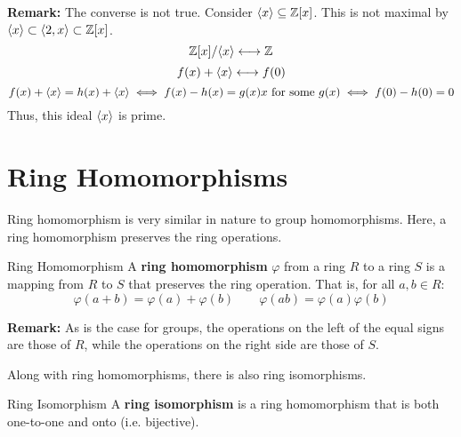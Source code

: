 \documentclass[letterpaper]{article}
\begin{document}
\textbf{Remark:} The converse is not true. Consider $\langle x \rangle \subseteq \mathbb{Z}[x]$. This is not maximal by $\langle x \rangle \subset \langle 2, x \rangle \subset \mathbb{Z}[x]$. 
\[\mathbb{Z}[x] / \langle x \rangle \longleftrightarrow \mathbb{Z}\]
\[f(x) + \langle x \rangle \longleftrightarrow f(0)\]
\[f(x) + \langle x \rangle = h(x) + \langle x \rangle \iff f(x) - h(x) = g(x)x \text{ for some } g(x) \iff f(0) - h(0) = 0\]
Thus, this ideal $\langle x \rangle$ is prime.

















\newpage
\section{Ring Homomorphisms}
Ring homomorphism is very similar in nature to group homomorphisms. Here, a ring homomorphism preserves the ring operations.

\begin{definition}{Ring Homomorphism}{}
    A \textbf{ring homomorphism} $\varphi$ from a ring $R$ to a ring $S$ is a mapping from $R$ to $S$ that preserves the ring operation. That is, for all $a, b \in R$:
    \[\varphi(a + b) = \varphi(a) + \varphi(b) \qquad \varphi(ab) = \varphi(a)\varphi(b)\]
\end{definition}
\textbf{Remark:} As is the case for groups, the operations on the left of the equal signs are those of $R$, while the operations on the right side are those of $S$. 

\bigskip

Along with ring homomorphisms, there is also ring isomorphisms.
\begin{definition}{Ring Isomorphism}{}
    A \textbf{ring isomorphism} is a ring homomorphism that is both one-to-one and onto (i.e. bijective).
\end{definition}
\end{document}
